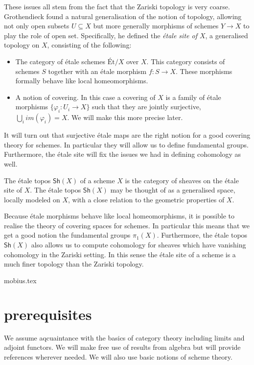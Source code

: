 These issues all stem from the fact that the Zariski topology is very coarse. Grothendieck found a natural generalisation of the notion of topology, allowing not only open subsets $U \subseteq X$ but more generally morphisms of schemes $Y \to X$ to play the role of open set. Specifically, he defined the \textit{\'etale site of $X$}, a generalised topology on $X$, consisting of the following:
\begin{itemize}
  \item The category of \'etale schemes $\text{\'Et}/X$ over $X$. This category consists of schemes $S$ together with an \'etale morphism $f: S \to X$. These morphisms formally behave like local homeomorphisms. 
  \item A notion of covering. In this case a covering of $X$ is a family of \'etale morphisms $\{\varphi_i: U_i \to X\}$ such that they are jointly surjective, $\bigcup_i im(\varphi_i) = X$. We will make this more precise later.
\end{itemize}
It will turn out that surjective \'etale maps are the right notion for a good covering theory for schemes. In particular they will allow us to define fundamental groups. Furthermore, the \'etale site will fix the issues we had in defining cohomology as well.

The \'etale topos $\mathsf{Sh}(X)$ of a scheme $X$ is the category of sheaves on the \'etale site of $X$.  The \'etale topos $\mathsf{Sh}(X)$ may be thought of as a generalised space, locally modeled on $X$, with a close relation to the geometric properties of $X$. 

Because \'etale morphisms behave like local homeomorphisms, it is possible to realise the theory of covering spaces for schemes. In particular this means that we get a good notion the fundamental groups $\pi_1(X)$. Furthermore, the \'etale topos $\mathsf{Sh}(X)$ also allows us to compute cohomology for sheaves which have vanishing cohomology in the Zariski setting. In this sense the \'etale site of a scheme is a much finer topology than the Zariski topology.


{mobius.tex}
\section{prerequisites}
We assume aqcuaintance with the basics of category theory including limits and adjoint functors. We will make free use of results from algebra but will provide references wherever needed. We will also use basic notions of scheme theory.